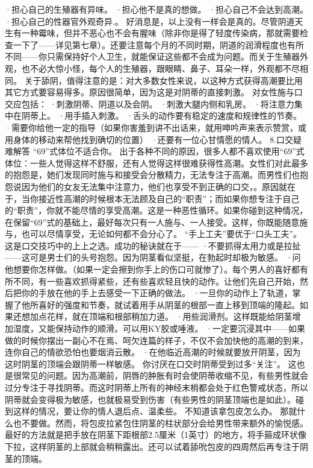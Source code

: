 \documentclass[12pt,UTF8]{ctexbook}
\begin{document}
·担心自己的生殖器有异味。
·担心他不是真的想做。
·担心自己不会达到高潮。
·担心自己的性器官外观奇异.。
好消息是，以上没有一样会是真的。尽管阴道天生有一种霉味，但并不恶心也不会有腥味（除非你是得了轻度传染病，那就需要检查一下了——详见第七章）。还要注意每个月的不同时期，阴道的润滑程度也有所不同——你只需保持好个人卫生，就能保证这些都不会成为问题。而关于生殖器外观，也不必大惊小怪，每个人的生殖器，跟眼睛、鼻子、耳朵一样，外观都不尽相同。
关于舔阴，值得注意的是：对大多数女性来说，以这种方式获得高潮要比用其它方式要容易得多。原因很简单，因为这是对阴蒂的直接刺激。
对女性施与口交应包括：
·刺激阴蒂、阴道以及会阴。
·刺激大腿内侧和乳房。
·将注意力集中在阴蒂上。
·用手插入刺激。
·舌头的动作要有稳定的速度和规律性的节奏。
·需要你给他一定的指导（如果你害羞到讲不出话来，就用呻吟声来表示赞赏，或用身体的移动来帮他找到确切的位置）
·还要有一位心甘情愿的情人。
8.口交疑难解答
“69”式体位不适合你。
出于各种不同的原因，很多人都不喜欢使用“69”式体位：一些人觉得这样不舒服，还有人觉得这样很难获得性高潮。女性们对此最多的抱怨是，她们发现同时施与和接受会分散精力，无法专注于高潮。而男性们也抱怨说因为他们的女友无法集中注意力，他们也享受不到正确的口交，。原因就在于，当你接近性高潮的时候根本无法顾及自己的“职责”；而如果你想专注于自己的“职责”，你就不能尽情的享受高潮。这是一种恶性循环。如果你碰到这种情况，在保留“69”式的基础上，最好每次只有一人施与、一人接受。这样，你既能随意施与，也可以尽情享受，无论如何都不会分心了。
“手上工夫”要优于“口头工夫”。
这是口交技巧中的上上之选。成功的秘诀就在于——
·不要抓得太用力或是拉扯——这可是男士们的头号抱怨。因为阴茎看似坚挺，在勃起时却极为敏感。
·问他想要你怎样做。（如果一定会擦到你手上的伤口可就惨了）。每个男人的喜好都有所不同，有一些喜欢抓得紧些，还有些喜欢轻且快的动作。让他们先自己开始，然后把你的手放在他的手上去感受一下正确的做法。
·一旦你的动作上了轨道，掌握了他所喜好的强度和节奏，就试着用手从阴茎的根部一直上移到顶端的隆起。如果还想加点花样，就在顶端和根部稍加力道。
·用些润滑剂。这样既能给阴茎增加湿度，又能保持动作的顺滑。可以用KY胶或唾液。
·一定要沉浸其中——如果做的时候你摆出一副心不在焉、呵欠连篇的样子，不仅不会加快他的高潮的到来，连你自己的情欲恐怕也要烟消云散。
·在他临近高潮的时候就要放开阴茎，因为这时阴茎的顶端会跟阴蒂一样敏感。
你讨厌在口交时阴蒂受到过多“关注”。
这也是很常见的问题。因为高潮前，阴唇的肿胀有时会使阴蒂收缩不见，有些男性就会过分专注于寻找阴蒂。而这时阴蒂上所有的神经末梢都会处于红色警戒状态，所以阴蒂就会变得极为敏感，也就极易受到伤害（有些男性的阴茎顶端也是如此）。碰到这样的情况，要让你的情人退后点、温柔些。
不知道该拿包皮怎么办。
那就什么也不要做。然而，将包皮拉紧包住阴茎的柱状部分会给男性带来额外的愉悦感。最好的方法就是把手放在阴茎下距根部2.5厘米（1英寸）的地方，将手箍成环状像下拉，这样阴茎的上部就会稍稍露出。还可以试着舔吮包皮的四周然后再专注于阴茎的顶端。
\end{document}
